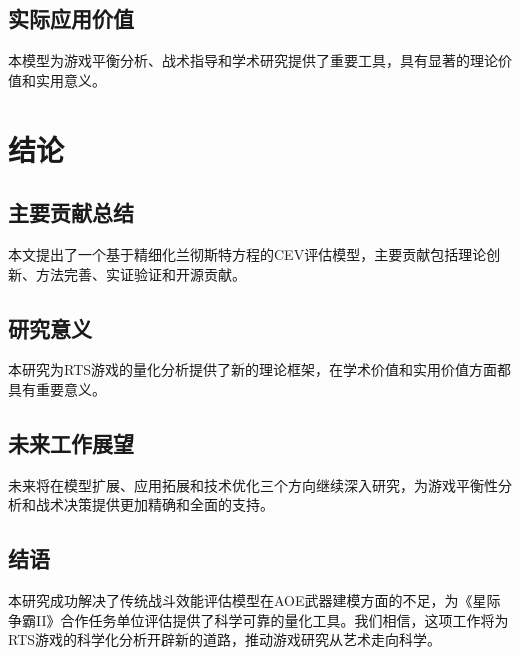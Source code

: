 \documentclass[a4paper,12pt]{article}
\begin{document}
\subsection{实际应用价值}

本模型为游戏平衡分析、战术指导和学术研究提供了重要工具，具有显著的理论价值和实用意义。

\section{结论}

\subsection{主要贡献总结}

本文提出了一个基于精细化兰彻斯特方程的CEV评估模型，主要贡献包括理论创新、方法完善、实证验证和开源贡献。

\subsection{研究意义}

本研究为RTS游戏的量化分析提供了新的理论框架，在学术价值和实用价值方面都具有重要意义。

\subsection{未来工作展望}

未来将在模型扩展、应用拓展和技术优化三个方向继续深入研究，为游戏平衡性分析和战术决策提供更加精确和全面的支持。

\subsection{结语}

本研究成功解决了传统战斗效能评估模型在AOE武器建模方面的不足，为《星际争霸II》合作任务单位评估提供了科学可靠的量化工具。我们相信，这项工作将为RTS游戏的科学化分析开辟新的道路，推动游戏研究从艺术走向科学。


\end{document}

